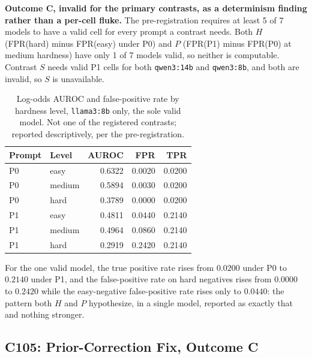 \textbf{Outcome C, invalid for the primary contrasts, as a determinism
finding rather than a per-cell fluke.} The pre-registration requires at least
5 of 7 models to have a valid cell for every prompt a contrast needs. Both
$H$ (FPR(hard) minus FPR(easy) under P0) and $P$ (FPR(P1) minus FPR(P0) at
medium hardness) have only 1 of 7 models valid, so neither is computable.
Contrast $S$ needs valid P1 cells for both \texttt{qwen3:14b} and
\texttt{qwen3:8b}, and both are invalid, so $S$ is unavailable.

\begin{table}[H]
\caption[C104, descriptive-only result from the one valid model]{Log-odds
AUROC and false-positive rate by hardness level, \texttt{llama3:8b} only, the
sole valid model. Not one of the registered contrasts; reported
descriptively, per the pre-registration.}
\centering
\begin{tabular}{llrrr}
\toprule
\textbf{Prompt} & \textbf{Level} & \textbf{AUROC} & \textbf{FPR} & \textbf{TPR} \\
\midrule
P0 & easy   & 0.6322 & 0.0020 & 0.0200 \\
P0 & medium & 0.5894 & 0.0030 & 0.0200 \\
P0 & hard   & 0.3789 & 0.0000 & 0.0200 \\
P1 & easy   & 0.4811 & 0.0440 & 0.2140 \\
P1 & medium & 0.4964 & 0.0860 & 0.2140 \\
P1 & hard   & 0.2919 & 0.2420 & 0.2140 \\
\bottomrule
\end{tabular}
\label{sup:tab:s5-c104-llama}
\end{table}

For the one valid model, the true positive rate rises from $0.0200$ under P0
to $0.2140$ under P1, and the false-positive rate on hard negatives rises
from $0.0000$ to $0.2420$ while the easy-negative false-positive rate rises
only to $0.0440$: the pattern both $H$ and $P$ hypothesize, in a single
model, reported as exactly that and nothing stronger.

\subsection{C105: Prior-Correction Fix, Outcome C}
\label{sup:sec:s5-c105}

